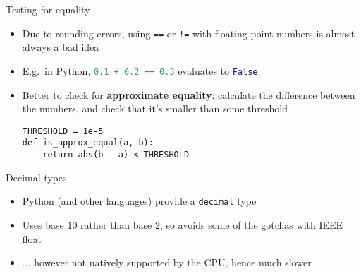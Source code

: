 \begin{frame}[fragile]{Testing for equality}
	\begin{itemize}
		\pause\item Due to rounding errors, using \lstinline{==} or \lstinline{!=} with floating point numbers is almost always a bad idea
		\pause\item E.g.\ in Python, \lstinline[language=Python]{0.1 + 0.2 == 0.3} evaluates to \lstinline[language=Python]{False}
		\pause\item Better to check for \textbf{approximate equality}: calculate the difference between the numbers,
			and check that it's smaller than some threshold
		\pause
		\begin{lstlisting}
THRESHOLD = 1e-5
def is_approx_equal(a, b):
    return abs(b - a) < THRESHOLD
		\end{lstlisting}
	\end{itemize}
\end{frame}

\begin{frame}{Decimal types}
	\begin{itemize}
		\pause\item Python (and other languages) provide a \lstinline{decimal} type
		\pause\item Uses base 10 rather than base 2, so avoids some of the gotchas with IEEE float
		\pause\item ... however not natively supported by the CPU, hence much slower
	\end{itemize}
\end{frame}
